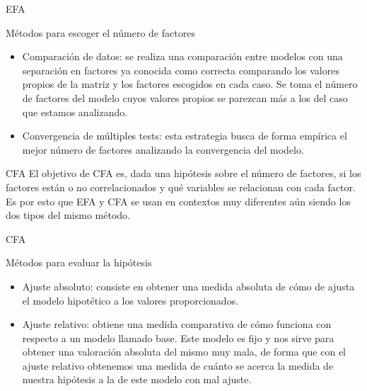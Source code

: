 \documentclass[10pt]{beamer}
\begin{document}
\begin{frame}[fragile]{EFA}
\vspace{10px}
\begin{block}{Métodos para escoger el número de factores}
	\begin{itemize}
		\item Comparación de datos: se realiza una comparación entre modelos con una separación en factores ya conocida como correcta comparando los valores propios de la matriz y los factores escogidos en cada caso. Se toma el número de factores del modelo cuyos valores propios se parezcan más a los del caso que estamos analizando.
		\item Convergencia de múltiples tests: esta estrategia busca de forma empírica el mejor número de factores analizando la convergencia del modelo.
	\end{itemize}
\end{block}
\end{frame}

\begin{frame}[fragile]{CFA}
	El objetivo de CFA es, dada una hipótesis sobre el número de factores, si los factores están o no correlacionados y qué variables se relacionan con cada factor. Es por esto que EFA y CFA se usan en contextos muy diferentes aún siendo los dos tipos del mismo método.
\end{frame}

\begin{frame}[fragile]{CFA}
\vspace{10px}
\begin{block}{Métodos para evaluar la hipótesis}
	\begin{itemize}
		\item Ajuste absoluto: consiste en obtener una medida absoluta de cómo de ajusta el modelo hipotético a los valores proporcionados.
		\item Ajuste relativo: obtiene una medida comparativa de cómo funciona con respecto a un modelo llamado base. Este modelo es fijo y nos sirve para obtener una valoración absoluta del mismo muy mala, de forma que con el ajuste relativo obtenemos una medida de cuánto se acerca la medida de nuestra hipótesis a la de este modelo con mal ajuste.
	\end{itemize}
\end{block}
\end{frame}
\end{document}
